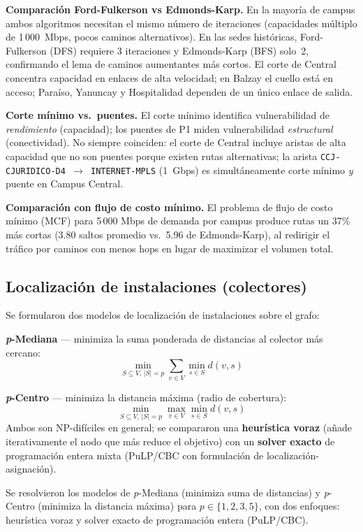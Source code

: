 \documentclass[11pt, a4paper]{article}
\begin{document}
\textbf{Comparación Ford-Fulkerson vs Edmonds-Karp.} En la mayoría de campus
ambos algoritmos necesitan el mismo número de iteraciones (capacidades múltiplo
de 1\,000~Mbps, pocos caminos alternativos). En las sedes históricas,
Ford-Fulkerson (DFS) requiere 3 iteraciones y Edmonds-Karp (BFS) solo~2,
confirmando el lema de caminos aumentantes más cortos. El corte de Central
concentra capacidad en enlaces de alta velocidad; en Balzay el cuello está en
acceso; Paraíso, Yanuncay y Hospitalidad dependen de un único enlace de salida.

\textbf{Corte mínimo vs.\ puentes.} El corte mínimo identifica vulnerabilidad
de \textit{rendimiento} (capacidad); los puentes de P1 miden vulnerabilidad
\textit{estructural} (conectividad). No siempre coinciden: el corte de Central
incluye aristas de alta capacidad que no son puentes porque existen rutas
alternativas; la arista \texttt{CCJ-CJURIDICO-D4\,$\to$\,INTERNET-MPLS}
(1~Gbps) es simultáneamente corte mínimo \textit{y} puente en Campus Central.

\textbf{Comparación con flujo de costo mínimo.} El problema de flujo de costo
mínimo (MCF) para 5\,000 Mbps de demanda por campus produce rutas un 37\%
más cortas (3.80 saltos promedio vs.\ 5.96 de Edmonds-Karp), al redirigir el
tráfico por caminos con menos hops en lugar de maximizar el volumen total.

\subsection{Localización de instalaciones (colectores)}

Se formularon dos modelos de localización de instalaciones sobre el grafo:

\textbf{\textit{p}-Mediana} — minimiza la suma ponderada de distancias al
colector más cercano:
\[
  \min_{S\subseteq V,\,|S|=p} \sum_{v \in V} \min_{s \in S} d(v,s)
\]

\textbf{\textit{p}-Centro} — minimiza la distancia máxima (radio de cobertura):
\[
  \min_{S\subseteq V,\,|S|=p} \max_{v \in V} \min_{s \in S} d(v,s)
\]
Ambos son NP-difíciles en general; se compararon una \textbf{heurística voraz}
(añade iterativamente el nodo que más reduce el objetivo) con un
\textbf{solver exacto} de programación entera mixta (PuLP/CBC con
formulación de localización-asignación).

Se resolvieron los modelos de \textit{p}-Mediana (minimiza suma de distancias)
y \textit{p}-Centro (minimiza la distancia máxima) para $p \in \{1,2,3,5\}$,
con dos enfoques: heurística voraz y solver exacto de programación entera (PuLP/CBC).
\end{document}

